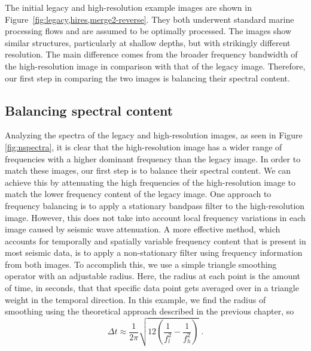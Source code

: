     The initial legacy and high-resolution example images are shown in Figure~\ref{fig:legacy,hires,merge2-reverse}. 
    They both underwent standard marine processing flows and are assumed to be optimally processed.
    The images show similar structures, particularly at shallow depths, but with strikingly different resolution. 
    The main difference comes from the broader frequency bandwidth of the high-resolution image in comparison with that of the legacy image. 
    Therefore, our first step in comparing the two images is balancing their spectral content.

\subsection{Balancing spectral content}

    Analyzing the spectra of the legacy and high-resolution images, as seen in Figure \ref{fig:nspectra}, it is clear that the high-resolution image has a wider range of frequencies with a higher dominant frequency than the legacy image. 
    In order to match these images, our first step is to balance their spectral content. 
    We can achieve this by attenuating the high frequencies of the high-resolution image to match the lower frequency content of the legacy image. 
    One approach to frequency balancing is to apply a stationary bandpass filter to the high-resolution image. 
    However, this does not take into account local frequency variations in each image caused by seismic wave attenuation.
    A more effective method, which accounts for temporally and spatially variable frequency content that is present in most seismic data, is to apply a non-stationary filter using frequency information from both images. 
    To accomplish this, we use a simple triangle smoothing operator with an adjustable radius. 
    Here, the radius at each point is the amount of time, in seconds, that that specific data point gets averaged over in a triangle weight in the temporal direction.
    In this example, we find the radius of smoothing using the theoretical approach described in the previous chapter, so 
    \begin{equation}
        \label{eq:rad}
        \Delta t \approx \frac{1}{2\pi}\sqrt{12\left(\frac{1}{f_{l}^{2}}-\frac{1}{f_{h}^{2}}\right)}\;.
    \end{equation}
